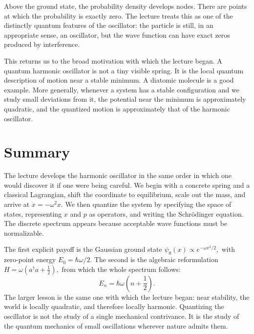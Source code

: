 Above the ground state, the probability density develops nodes. There are points at which the probability is exactly zero. The lecture treats this as one of the distinctly quantum features of the oscillator: the particle is still, in an appropriate sense, an oscillator, but the wave function can have exact zeros produced by interference.

This returns us to the broad motivation with which the lecture began. A quantum harmonic oscillator is not a tiny visible spring. It is the local quantum description of motion near a stable minimum. A diatomic molecule is a good example. More generally, whenever a system has a stable configuration and we study small deviations from it, the potential near the minimum is approximately quadratic, and the quantized motion is approximately that of the harmonic oscillator.

\section{Summary}

The lecture develops the harmonic oscillator in the same order in which one would discover it if one were being careful. We begin with a concrete spring and a classical Lagrangian, shift the coordinate to equilibrium, scale out the mass, and arrive at
\(
\ddot x=-\omega^{2}x.
\)
We then quantize the system by specifying the space of states, representing \(x\) and \(p\) as operators, and writing the Schr\"odinger equation. The discrete spectrum appears because acceptable wave functions must be normalizable.

The first explicit payoff is the Gaussian ground state
\(
\psi_{0}(x)\propto e^{-\omega x^{2}/2},
\)
with zero-point energy
\(
E_{0}=\hbar\omega/2.
\)
The second is the algebraic reformulation
\(
H=\omega(a^{\dagger}a+\tfrac{1}{2}),
\)
from which the whole spectrum follows:
\begin{equation}
E_{n}=\hbar\omega\left(n+\frac{1}{2}\right).
\end{equation}
The larger lesson is the same one with which the lecture began: near stability, the world is locally quadratic, and therefore locally harmonic. Quantizing the oscillator is not the study of a single mechanical contrivance. It is the study of the quantum mechanics of small oscillations wherever nature admits them.